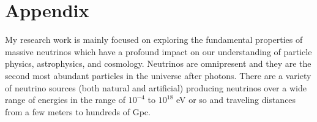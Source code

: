 \chapter{Appendix}
\label{C7}
\par My research work is mainly focused on exploring the fundamental properties of massive neutrinos which have a profound impact on our understanding of particle physics, astrophysics, and cosmology. Neutrinos are omnipresent and they are the second most abundant particles in the universe after photons. There are a variety of neutrino sources (both natural and artificial) producing neutrinos over a wide range of energies in the range of $10^{-4}$ to $10^{18}$ eV or so and traveling distances from a few meters to hundreds of Gpc.